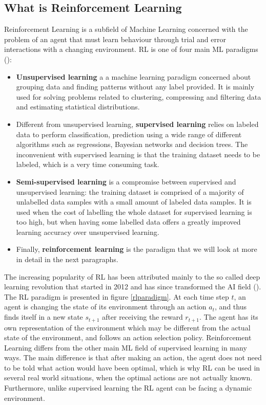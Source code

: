 \subsection{What is Reinforcement Learning}
Reinforcement Learning is a subfield of Machine Learning concerned with the problem of an agent that must learn behaviour through trial and error interactions with a changing environment. RL is one of four main ML paradigms (\cite{Alloghani2020}):
\begin{itemize}
	\item \textbf{Unsupervised learning} a a machine learning paradigm concerned about grouping data and finding patterns without any label provided. It is mainly used for solving problems related to clustering, compressing and filtering data and estimating statistical distributions.
	\item Different from unsupervised learning, \textbf{supervised learning} relies on labeled data to perform classification, prediction using a wide range of different algorithms such as regressions, Bayesian networks and decision trees. The inconvenient with supervised learning is that the training dataset needs to be labeled, which is a very time consuming task.
	\item \textbf{Semi-supervised learning} is a compromise between supervised and unsupervised learning: the training dataset is comprised of a majority of unlabelled data samples with a small amount of labeled data samples. It is used when the cost of labelling the whole dataset for supervised learning is too high, but when having some labelled data offers a greatly improved learning accuracy over unsupervised learning.
	\item Finally, \textbf{reinforcement learning} is the paradigm that we will look at more in detail in the next paragraphs.
\end{itemize}


The increasing popularity of RL has been attributed mainly to the so called deep learning revolution that started in 2012 and has since transformed the AI field (\cite{sejnowski2018deep}). \newline
The RL paradigm is presented in figure \ref{rlparadigm}. At each time step $t$, an agent is changing the state of its environment through an action $a_t$, and thus finds itself in a new state $s_{t+1}$ after receiving the reward $r_{t+1}$. The agent has its own representation of the environment which may be different from the actual state of the environment, and follows an action selection policy. \newline
Reinforcement Learning differs from the other main ML field of supervised learning in many ways. The main difference is that after making an action, the agent does not need to be told what action would have been optimal, which is why RL can be used in several real world situations, when the optimal actions are not actually known. Furthermore, unlike supervised learning the RL agent can be facing a dynamic environment. 

